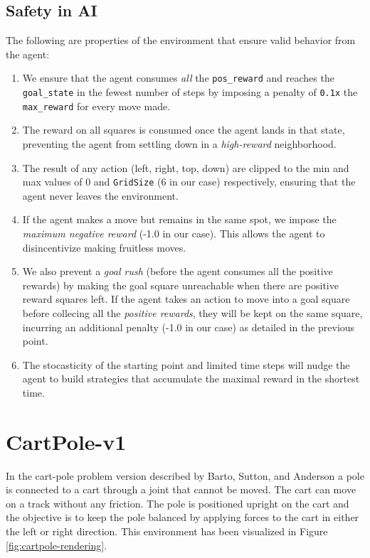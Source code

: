 \documentclass{article} %
\begin{document}
\subsection{Safety in AI}
\label{sec:safety}
The following are properties of the environment that ensure valid behavior from the agent:

\begin{enumerate}
    \item We ensure that the agent consumes \textit{all} the \verb|pos_reward| and reaches
        the \verb|goal_state| in the fewest number of steps by imposing a penalty of \verb|0.1x|
        the \verb|max_reward| for every move made.
    \item The reward on all squares is consumed once the agent lands in that state, preventing 
    the agent from settling down in a \textit{high-reward} neighborhood.
    \item The result of any action (left, right, top, down) are clipped to the min and max
        values of 0 and \verb|GridSize| (6 in our case) respectively, ensuring that the
        agent never leaves the environment.
    \item If the agent makes a move but remains in the same spot, we impose the \textit{maximum negative
        reward} (-1.0 in our case). This allows the agent to disincentivize making fruitless
        moves.
    \item We also prevent a \textit{goal rush} (before the agent consumes all the positive
        rewards) by making the goal square unreachable when there are positive reward squares
        left. If the agent takes an action to move into a goal square before collecing all the
        \textit{positive rewards}, they will be kept on the same square, incurring an additional
        penalty (-1.0 in our case) as detailed in the previous point.
    \item The stocasticity of the starting point and limited time steps will nudge the agent
        to build strategies that accumulate the maximal reward in the shortest time.
\end{enumerate}

\section{CartPole-v1}
\label{sec:cart-definition}

In the cart-pole problem version described by Barto, Sutton, and Anderson 
\cite{barto1983neuronlike} a pole is
connected to a cart through a joint that cannot be moved. The cart can move on a track
without any friction. The pole is positioned upright on the cart and the objective is to
keep the pole balanced by applying forces to the cart in either the left or right direction.
This environment has been visualized in Figure \ref{fig:cartpole-rendering}.
\end{document}
